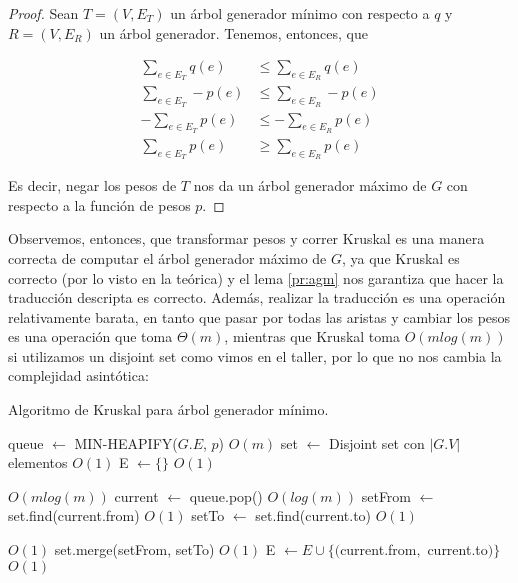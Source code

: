 \documentclass{article}
\theoremstyle{definition}
\theoremstyle{remark}
\begin{document}
\begin{proof}
Sean $T = (V, E_T)$ un árbol generador mínimo con respecto a $q$ y $R = (V, E_R)$ un árbol generador. Tenemos, entonces, que

\begin{align*}
\sum_{e \in E_T} q(e) &\leq \sum_{e \in E_R} q(e)\\
\sum_{e \in E_T} -p(e) &\leq \sum_{e \in E_R} -p(e)\\
-\sum_{e \in E_T} p(e) &\leq -\sum_{e \in E_R} p(e)\\
\sum_{e \in E_T} p(e) &\geq \sum_{e \in E_R} p(e)
\end{align*}

Es decir, negar los pesos de $T$ nos da un árbol generador máximo de $G$ con respecto a la función de pesos $p$.
\end{proof}

Observemos, entonces, que transformar pesos y correr Kruskal es una manera correcta de computar el árbol generador máximo de $G$, ya que Kruskal es correcto (por lo visto en la teórica) y el lema \ref{pr:agm} nos garantiza que hacer la traducción descripta es correcto. Además, realizar la traducción es una operación relativamente barata, en tanto que pasar por todas las aristas y cambiar los pesos es una operación que toma $\Theta(m)$, mientras que Kruskal toma $O(m log(m))$ si utilizamos un disjoint set como vimos en el taller, por lo que no nos cambia la complejidad asintótica:

\begin{algorithm}[h!]
\caption{Algoritmo de Kruskal para árbol generador mínimo. \label{alg:kruskal}}

\begin{algorithmic}[h!]
\State queue $\gets$ MIN-HEAPIFY($G.E$, $p$) \Comment $O(m)$
\State set $\gets$ Disjoint set con $|G.V|$ elementos \Comment $O(1)$
\State E $\gets \{\}$ \Comment $O(1)$

 \Comment $O(m log(m))$
\State current $\gets$ queue.pop() \Comment $O(log(m))$
\State setFrom $\gets$ set.find(current.from) \Comment $O(1)$
\State setTo $\gets$ set.find(current.to) \Comment $O(1)$

 \Comment $O(1)$
\State set.merge(setFrom, setTo) \Comment $O(1)$
\State E $\gets E \cup \{($current.from$,$ current.to$)\}$ \Comment $O(1)$
\EndIf
\EndWhile
\EndProcedure
\end{algorithmic}
\end{algorithm}
\end{document}
